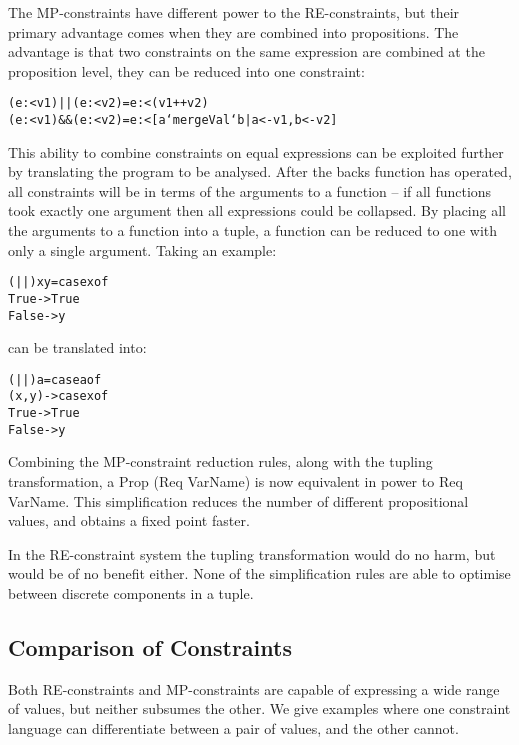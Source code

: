 \documentclass[preprint]{sigplanconf}
\newcommand{\C}[1]{\textsf{#1}}
\newenvironment{code}{\begin{alltt}\small}{\end{alltt}}
\begin{document}
The MP-constraints have different power to the RE-constraints, but their primary advantage comes when they are combined into propositions. The advantage is that two constraints on the same expression are combined at the proposition level, they can be reduced into one constraint:

\begin{code}
(e :< v1) || (e :< v2) = e :< (v1 ++ v2)
(e :< v1) && (e :< v2) = e :< [a `mergeVal` b | a <- v1, b <- v2]
\end{code}

This ability to combine constraints on equal expressions can be exploited further by translating the program to be analysed. After the \C{backs} function has operated, all constraints will be in terms of the arguments to a function -- if all functions took exactly one argument then all expressions could be collapsed. By placing all the arguments to a function into a tuple, a function can be reduced to one with only a single argument. Taking an example:

\begin{code}
(||) x y = case  x of
                 True   -> True
                 False  -> y
\end{code}

\noindent can be translated into:

\begin{code}
(||) a = case  a of
               (x,y) -> case  x of
                              True    -> True
                              False   -> y
\end{code}

Combining the MP-constraint reduction rules, along with the tupling transformation, a \C{Prop (Req VarName)} is now equivalent in power to \C{Req VarName}. This simplification reduces the number of different propositional values, and obtains a fixed point faster.

In the RE-constraint system the tupling transformation would do no harm, but would be of no benefit either. None of the simplification rules are able to optimise between discrete components in a tuple.

\subsection{Comparison of Constraints}

Both RE-constraints and MP-constraints are capable of expressing a wide range of values, but neither subsumes the other. We give examples where one constraint language can differentiate between a pair of values, and the other cannot.
\end{document}
